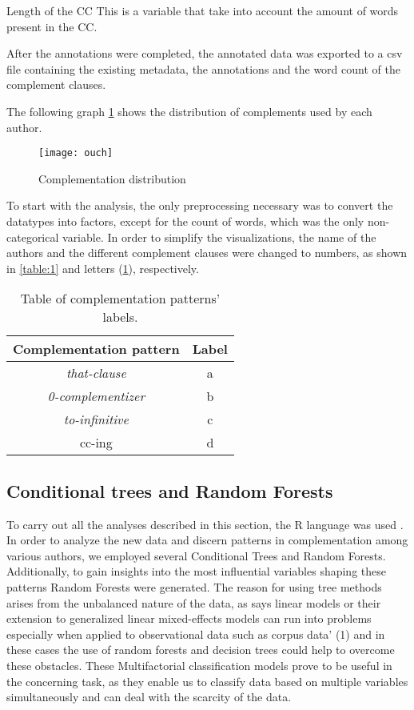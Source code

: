 \documentclass[final]{clv3} %
\begin{document}
\item {Length of the CC} This is a variable that take into account the amount of words present in the CC.

After the annotations were completed, the annotated data was exported to a csv file containing the existing metadata, the annotations and the word count of the complement clauses.

The following graph \cref{fig:0} shows the distribution of complements used by each author.

\begin{figure}[htpb]
    \centering
    \texttt{[image: ouch]}
    \caption{Complementation distribution}
    \label{fig:0}
\end{figure}

To start with the analysis, the only preprocessing necessary was to convert the datatypes into factors, except for the count of words, which was the only non-categorical variable. In order to simplify the visualizations, the name of the authors and the different complement clauses were changed to numbers, as shown in \cref{table:1} and letters (\cref{table:2}), respectively.

\begin{table}[h!]
\centering
\begin{tabular}{|c | c|} 
 \hline
 Complementation pattern & Label \\ [0.5ex] 
 \hline
 \textit{that-clause} & a \\ 
 \hline
 \textit{0-complementizer} & b \\
 \hline
 \textit{to-infinitive} & c \\
 \hline
 cc-ing & d \\ [1ex] 
 \hline
\end{tabular}
\caption{Table of complementation patterns' labels.}
\label{table:2}
\end{table}


\subsection{Conditional trees and Random Forests}
To carry out all the analyses described in this section, the R language was used \citep{r}. In order to analyze the new data and discern patterns in complementation among various authors, we employed several Conditional Trees and Random Forests. Additionally, to gain insights into the most influential variables shaping these patterns Random Forests were generated.
The reason for using tree methods arises from the unbalanced nature of the data, as \citet{th2019classification} says linear models or their extension to generalized linear mixed-effects
models can run into problems especially when applied to observational data such as corpus data' (1) and in these cases the use of random forests and decision trees could help to overcome these obstacles. These Multifactorial classification models prove to be useful in the concerning task, as they enable us to classify data based on multiple variables simultaneously and can deal with the scarcity of the data.  
\end{document}
